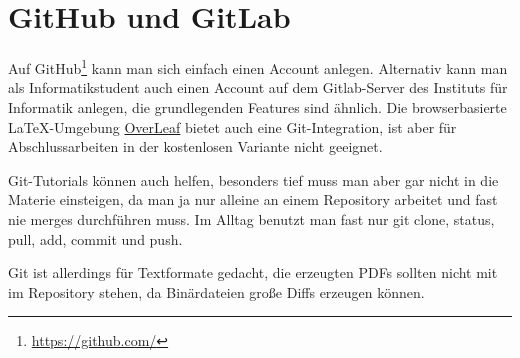 \section{GitHub und GitLab}
Auf GitHub\footnote{\url{https://github.com/}} kann man sich einfach einen Account anlegen.
Alternativ kann man als Informatikstudent auch einen Account auf dem Gitlab-Server des Instituts für Informatik\footnotemark{} anlegen, die grundlegenden Features sind ähnlich.
Die browserbasierte LaTeX-Umgebung \href{https://www.overleaf.com/}{OverLeaf} bietet auch eine Git-Integration, ist aber für Abschlussarbeiten in der kostenlosen Variante nicht geeignet.

Git-Tutorials\footnotemark{} können auch helfen, besonders tief muss man aber gar nicht in die Materie einsteigen, da man ja nur alleine an einem Repository arbeitet und fast nie merges durchführen muss.
Im Alltag benutzt man fast nur git clone, status, pull, add, commit und push.

Git ist allerdings für Textformate gedacht, die erzeugten PDFs sollten nicht mit im Repository stehen, da Binärdateien große Diffs erzeugen können.
